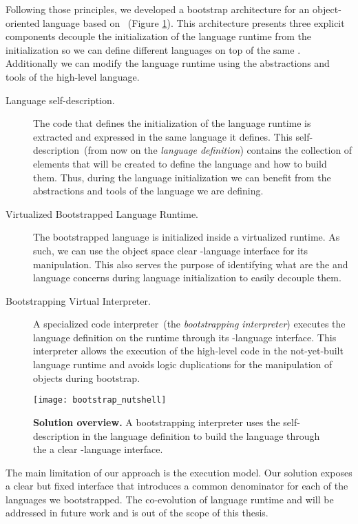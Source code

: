 Following those principles, we developed a bootstrap architecture for an object-oriented language based on \Vtt~(Figure \ref{fig:bootstrapping_overview}). This architecture presents three explicit components decouple the initialization of the language runtime from the \VM initialization so we can define different languages on top of the same \VM. Additionally we can modify the language runtime using the abstractions and tools of the high-level language.

\begin{description}
\item[Language self-description.] The code that defines the initialization of the language runtime is extracted and expressed in the same language it defines. This self-description~(from now on the \emph{language definition}) contains the collection of elements that will be created to define the language and how to build them. Thus, during the language initialization we can benefit from the abstractions and tools of the language we are defining.
\item[Virtualized Bootstrapped Language Runtime.] The bootstrapped language is initialized inside a virtualized runtime. As such, we can use the object space clear \VM-language interface for its manipulation. This also serves the purpose of identifying what are the \VM and language concerns during language initialization to easily decouple them.
\item[Bootstrapping Virtual Interpreter.] A specialized code interpreter~(the \emph{bootstrapping interpreter}) executes the language definition on the runtime through its \VM-language interface. This interpreter allows the execution of the high-level code in the not-yet-built language runtime and avoids logic duplications for the manipulation of objects during bootstrap.
\end{description}

\begin{figure}[ht]
\center
\texttt{[image: bootstrap\_nutshell]}
\caption{\textbf{Solution overview.} A bootstrapping interpreter uses the self-description in the language definition to build the language through the a clear \VM-language interface.\label{fig:bootstrapping_overview}}
\end{figure}

The main limitation of our approach is the \VM execution model. Our solution exposes a clear but fixed \VM interface that introduces a common denominator for each of the languages we bootstrapped. The co-evolution of language runtime and \VM will be addressed in future work and is out of the scope of this thesis.

